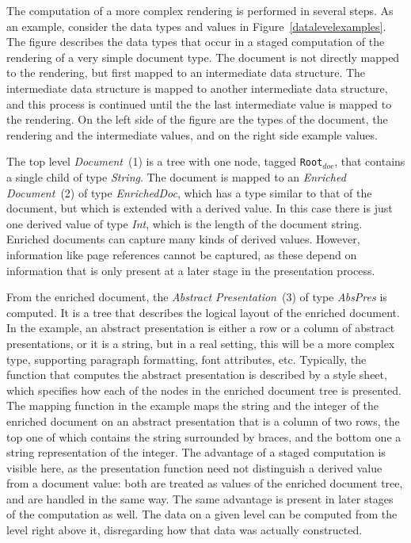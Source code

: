 The computation of a more complex rendering is performed in several steps. As an example, consider the data types and values in Figure~\ref{datalevelexamples}. The figure describes the data types that occur in a staged computation of the rendering of a very simple document type. The document is not directly mapped to the rendering, but first mapped to an intermediate data structure. The intermediate data structure is mapped to another intermediate data structure, and this process is continued until the the last intermediate value is mapped to the rendering. On the left side of the figure are the types of the document, the rendering and the intermediate values, and on the right side example values. 

The top level {\em Document}~(1) is a tree with one node, tagged \texttt{Root}$_{doc}$, that contains a single child of type {\em String}. The document is mapped to an {\em Enriched Document}~(2) of type {\em EnrichedDoc}, which has a type similar to that of the document, but which is extended with a derived value. In this case there is just one derived value of type {\em Int}, which is the length of the document string. Enriched documents can capture many kinds of derived values. However, information like page references cannot be captured, as these depend on information that is only present at a later stage in the presentation process. 

From the enriched document, the {\em Abstract Presentation}~(3) of type {\em AbsPres} is computed. It is a tree that describes the logical layout of the enriched document. In the example, an abstract presentation is either a row or a column of abstract presentations, or it is a string, but in a real setting, this will be a more complex type, supporting paragraph formatting, font attributes, etc. Typically, the function that computes the abstract presentation is described by a style sheet, which specifies how each of the nodes in the enriched document tree is presented. The mapping function in the example maps the string and the integer of the enriched document on an abstract presentation that is a column of two rows, the top one of which contains the string surrounded by braces, and the bottom one a string representation of the integer. The advantage of a staged computation is visible here, as the presentation function need not distinguish a derived value from a document value: both are treated as values of the enriched document tree, and are handled in the same way. The same advantage is present in later stages of the computation as well. The data on a given level can be computed from the level right above it, disregarding how that data was actually constructed. 

